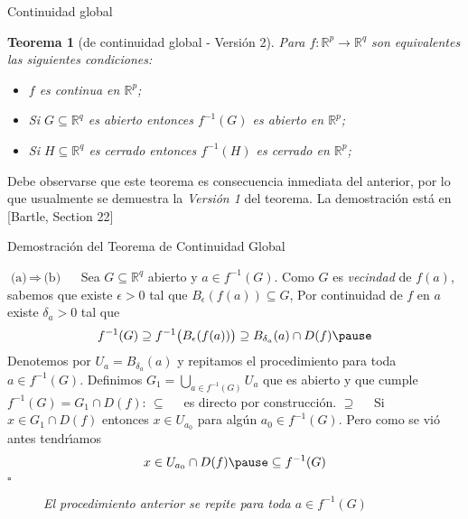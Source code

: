 \documentclass[xcolor=dvipsnames,10pt,handout, draft]{beamer}
\newcommand{\incfig}[1]{%
    \def\svgwidth{3.5in}
    {#1.pdf_tex}
}
\newcommand{\rzp}{\mathbb R^{p}}
\newcommand{\rzq}{\mathbb R^{q}}
\newtheorem*{teo}{Teorema}
\begin{document}
\begin{frame}{Continuidad global}

\begin{teo}[de continuidad global - Versi\'on 2]
Para $f:\rzp\to\rzq$ son equivalentes las siguientes condiciones:
\begin{itemize}
\item $f$ es continua en $\rzp$;\pause
\item Si $G\subseteq\rzq$ es abierto entonces $\displaystyle f^{-1}(G)$ es abierto en $\rzp$;\pause
\item Si $H\subseteq\rzq$ es cerrado entonces $\displaystyle f^{-1}(H)$ es cerrado en $\rzp$;\pause
\end{itemize}
\end{teo}

Debe observarse que este teorema es consecuencia inmediata del anterior, por lo que usualmente se demuestra la {\em Versi\'on 1} del teorema.
\vskip4pt\pause
La demostraci\'on est\'a en [Bartle, Section 22]
\end{frame}



\begin{frame}{Demostraci\'on del Teorema de Continuidad Global}

{\color{green!59!black} $\text{(a)}\,\Rightarrow\,\text{(b)}\quad$} Sea $G\subseteq\rzq$ abierto y $a\in f^{-1}(G)$. \pause\vskip4pt Como $G$ es {\em vecindad} de $f(a)$, sabemos que existe $\epsilon>0$ tal que $B_\epsilon(f(a))\subseteq G$, \pause\vskip4pt Por continuidad de $f$ en $a$ existe $\delta_a>0$ tal que 
$$f^{-1}(G)\supseteq f^{-1}\big(B_\epsilon(f(a))\big)\supseteq B_{\delta_a}(a)\cap D(f) \pause$$
Denotemos por $U_a=B_{\delta_a}(a)$ y repitamos el procedimiento para toda $a\in f^{-1}(G)$. \pause\vskip4pt Definimos $\displaystyle G_1=\bigcup_{a\in f^{-1}(G)}U_a$ que es abierto y que cumple $f^{-1}(G)=G_1\cap D(f)$:
\pause\vskip8pt
{\color{green!59!black} $\subseteq\quad$} es directo por construcci\'on.\pause\vskip4pt
{\color{green!59!black} $\supseteq\quad$} Si $x\in G_1\cap D(f)$ entonces $x\in U_{a_0}$ para alg\'un $a_0\in f^{-1}(G)$. \pause Pero como se vi\'o antes tendr\'\i amos
$$x\in U_{a_0}\cap D(f)\pause\subseteq f^{-1}(G)$$
\hfill$\square$

\end{frame}


\begin{frame}

\begin{figure}[ht]
    \centering
    \caption{\em El procedimiento anterior se repite para toda $a \in f^{-1}(G)$}
\end{figure}

\end{frame}
\end{document}
